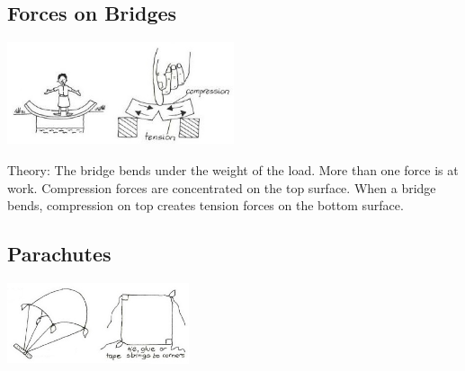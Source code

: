 \begin{multicols}{2}
\subsection{Forces on Bridges}

\begin{center}
\includegraphics[width=0.5\textwidth]{./img/vso/forces-bridges.jpg}
\end{center}

\begin{description*}
\item[Theory:]{The bridge bends under the
weight of the load. More than
one force is at work. Compression
forces are concentrated on the
top surface. When a bridge
bends, compression on top
creates tension forces on the
bottom surface.}
\end{description*}

\subsection{Parachutes}

\begin{center}
\includegraphics[width=0.4\textwidth]{./img/vso/parachute.jpg}
\end{center}


\end{multicols}
